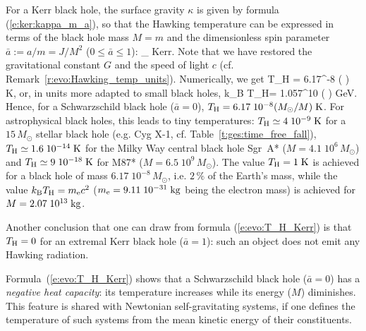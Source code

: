 For a Kerr black hole, the surface gravity $\kappa$ is given by formula (\ref{e:ker:kappa_m_a}),
so that the Hawking temperature can be expressed in terms
of the black hole mass $M=m$ and the dimensionless spin parameter
$\bar{a} := a/m = J/M^2$ ($0\leq \bar{a}\leq 1$):
\be \label{e:evo:T_H_Kerr}
    _{\rm\; Kerr}.
\ee
Note that we have restored the gravitational constant $G$ and the speed of light $c$
(cf. Remark~\ref{r:evo:Hawking_temp_units}). Numerically, we get
\be
    T_{\rm H} = 6.17^{-8} \left(  \right)
     {\rm\; K},
\ee
or, in units more adapted to small black holes,
\be
    k_{\rm B} T_{\rm H}= 1.057^{10} \left(  \right)
     {\rm\; GeV}.
\ee
Hence, for a Schwarzschild black hole ($\bar{a}=0$),
$T_{\rm H} = 6.17\; 10^{-8} ({M_\odot}/{M}) {\rm\; K}$. For astrophysical black holes,
this leads to tiny temperatures: $T_{\rm H} \simeq 4\; 10^{-9} {\rm\; K}$
for a $15 \, M_\odot$ stellar black hole (e.g. Cyg X-1, cf. Table~\ref{t:ges:time_free_fall}),
$T_{\rm H} \simeq 1.6\; 10^{-14} {\rm\; K}$ for the Milky Way central black hole Sgr~A*
($M=4.1\; 10^{6} \, M_\odot$)
and $T_{\rm H} \simeq 9\; 10^{-18} {\rm\; K}$ for M87*
($M=6.5\; 10^{9} \, M_\odot$). The value $T_{\rm H} = 1 {\rm\; K}$ is achieved
for a black hole of mass $6.17\; 10^{-8} \, M_\odot$, i.e. $2\, \%$ of the
Earth's mass, while the value $k_{\rm B} T_{\rm H} = m_{\rm e} c^2$
($m_{\rm e} = 9.11\; 10^{-31}\; {\rm kg}$ being the electron mass) is achieved
for $M = 2.07\; 10^{13}\; {\rm kg}$.

Another conclusion that one can draw from formula (\ref{e:evo:T_H_Kerr}) is
that $T_{\rm H}=0$ for an extremal Kerr black hole ($\bar{a}=1$): such an object does not emit any Hawking radiation.

\begin{remark} \label{r:evo:negative_heat_capacity}
Formula~(\ref{e:evo:T_H_Kerr}) shows that a Schwarzschild black hole ($\bar{a} = 0$)
has a \emph{negative heat capacity}:
its temperature increases while its energy
($M$) diminishes. This feature is shared with Newtonian self-gravitating systems,
if one defines the temperature of such systems from the mean kinetic energy
of their constituents.
\end{remark}

